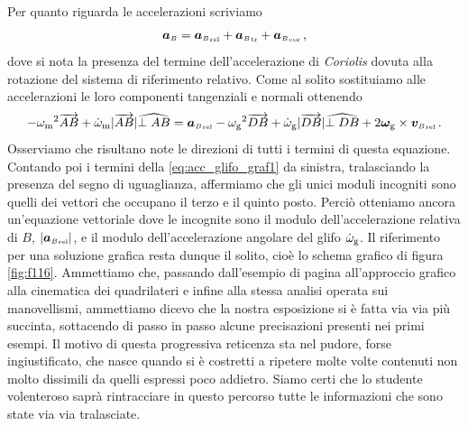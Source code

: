 \noindent Per quanto riguarda le accelerazioni scriviamo
\begin{equation}
{\bm a}_{\scriptscriptstyle{B}}= 
{{\bm a}_{\scriptscriptstyle{B}}}_{\scriptscriptstyle{{\rm rel}}} 
+{{\bm a}_{\scriptscriptstyle{B}}}_{\scriptscriptstyle{{\rm tr}}} 
+{{\bm a}_{\scriptscriptstyle{B}}}_{\scriptscriptstyle{{\rm cor}}}\,,
\label{eq:acc_glifo_graf0}
\end{equation}
\noindent dove si nota la presenza del termine dell'accelerazione di {\em Coriolis}
dovuta alla rotazione del sistema di riferimento relativo.
Come al solito sostituiamo alle accelerazioni le loro componenti tangenziali
e normali ottenendo
\begin{equation}
-{\omega_{\rm m}}^2 \overrightarrow{AB} + \dot{\omega}_{\rm m}|\overrightarrow{AB}|\widehat{{\perp{AB}}}=
{{\bm a}_{\scriptscriptstyle{B}}}_{\scriptscriptstyle{{\rm rel}}} 
-{\omega_{\rm g}}^2 \overrightarrow{DB} + \dot{\omega}_{\rm g}|\overrightarrow{DB}|\widehat{{\perp{DB}}}+
2{\bm \omega}_{\rm g}\times
{{\bm v}_{\scriptscriptstyle{B}}}_{\scriptscriptstyle{{\rm rel}}}\,.
\label{eq:acc_glifo_graf1}
\end{equation}
\vskip 1mm
\noindent Osserviamo che risultano note le direzioni di tutti i termini
di questa equazione.
Contando poi i termini della \ref{eq:acc_glifo_graf1} da sinistra, tralasciando
la presenza del segno di uguaglianza, affermiamo che gli unici moduli incogniti
sono quelli dei vettori che occupano il terzo e il quinto posto. 
Perci\`o otteniamo ancora un'equazione vettoriale
dove le incognite sono
il modulo dell'accelerazione relativa di $B$,
$|{{\bm a}_{\scriptscriptstyle{B}}}_{\scriptscriptstyle{{\rm rel}}}|$,
e il modulo dell'accelerazione angolare del glifo
${\dot\omega_{\rm g}}$.
Il riferimento per una soluzione grafica resta dunque 
il solito, cio\`e lo schema grafico di figura \ref{fig:f116}.
Ammettiamo che, passando dall'esempio di pagina \pageref{fig:f116}
all'approccio grafico alla cinematica dei quadrilateri e infine
alla stessa analisi operata sui manovellismi, ammettiamo
dicevo che la nostra esposizione si 
\`e fatta via via pi\`u succinta, sottacendo di passo in passo
alcune precisazioni presenti nei primi esempi.
Il motivo di questa progressiva reticenza sta nel pudore, forse ingiustificato,
che nasce quando si \`e costretti a ripetere molte volte contenuti non
molto dissimili da quelli espressi poco addietro.
 Siamo certi che lo studente volenteroso
sapr\`a rintracciare in questo percorso tutte le informazioni che
sono state via via tralasciate.


